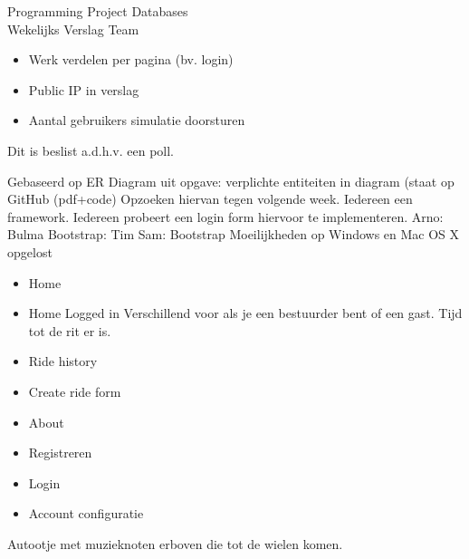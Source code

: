\documentclass{article}
\newcounter{team}
\begin{document}
	
	\begin{Minutes}{Programming Project Databases \\ Wekelijks Verslag Team }
		\missingNoExcuse{/}
		\missingExcused{}
		
		\maketitle
		
		
		\begin{itemize}
			\item Werk verdelen per pagina (bv. login)
			\item Public IP in verslag
			\item Aantal gebruikers simulatie doorsturen 
		\end{itemize}
		
			

			
					Dit is beslist a.d.h.v. een poll.
					\begin{Vote}
					\end{Vote}
					
					Gebaseerd op ER Diagram uit opgave: verplichte entiteiten in diagram (staat op GitHub (pdf+code)
							Opzoeken hiervan tegen volgende week. Iedereen een framework. Iedereen probeert een login form hiervoor te implementeren.
							Arno: Bulma
							Bootstrap: Tim
							Sam: Bootstrap
					Moeilijkheden op Windows en Mac OS X opgelost
					\begin{itemize}
						\item Home
						\item Home Logged in
							Verschillend voor als je een bestuurder bent of een gast. Tijd tot de rit er is. 
						\item Ride history	
						\item Create ride form
						\item About
						\item Registreren
						\item Login 
						\item Account configuratie
					\end{itemize}
					Autootje met muzieknoten erboven die tot de wielen komen.
					

\end{Minutes}
\end{document}
